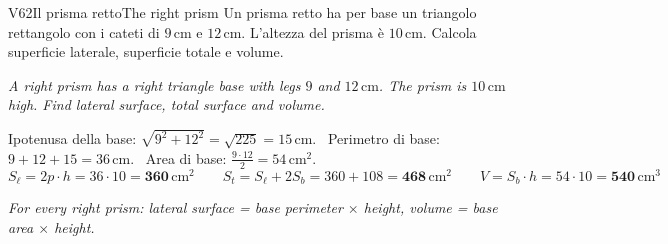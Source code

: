 \documentclass[11pt,a4paper]{article}
\newcommand{\en}[1]{\par{\small\itshape\color{engray}#1\par}}
\newcommand{\unit}[1]{\,\mathrm{#1}}
\newcommand{\cm}{\unit{cm}}
\newcommand{\cmq}{\unit{cm^2}}
\newcommand{\cmc}{\unit{cm^3}}
\newcommand{\rang}[3]{\pic[draw, line width=0.5pt, angle radius=2.2mm] {right angle=#1--#2--#3};}
\begin{document}
\begin{esercizio}{V6}{2}{Il prisma retto}{The right prism}
Un prisma retto ha per base un triangolo rettangolo con i cateti di $9\cm$ e $12\cm$. L'altezza del prisma è $10\cm$. Calcola superficie laterale, superficie totale e volume.
\en{A right prism has a right triangle base with legs $9$ and $12\cm$. The prism is $10\cm$ high. Find lateral surface, total surface and volume.}
\begin{center}
\end{center}
\end{esercizio}
\begin{solbox}
Ipotenusa della base: $\sqrt{9^2+12^2}=\sqrt{225}=15\cm$. \ Perimetro di base: $9+12+15=36\cm$. \ Area di base: $\frac{9\cdot12}{2}=54\cmq$.
\[S_\ell=2p\cdot h=36\cdot10=\mathbf{360\cmq}\qquad S_t=S_\ell+2S_b=360+108=\mathbf{468\cmq}\qquad V=S_b\cdot h=54\cdot10=\mathbf{540\cmc}\]
\en{For every right prism: lateral surface = base perimeter $\times$ height, volume = base area $\times$ height.}
\end{solbox}
\end{document}
